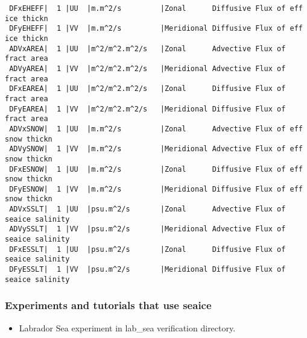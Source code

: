 \begin{table}[h!]
{\begin{verbatim}
 DFxEHEFF|  1 |UU  |m.m^2/s         |Zonal      Diffusive Flux of eff ice thickn
 DFyEHEFF|  1 |VV  |m.m^2/s         |Meridional Diffusive Flux of eff ice thickn
 ADVxAREA|  1 |UU  |m^2/m^2.m^2/s   |Zonal      Advective Flux of fract area
 ADVyAREA|  1 |VV  |m^2/m^2.m^2/s   |Meridional Advective Flux of fract area
 DFxEAREA|  1 |UU  |m^2/m^2.m^2/s   |Zonal      Diffusive Flux of fract area
 DFyEAREA|  1 |VV  |m^2/m^2.m^2/s   |Meridional Diffusive Flux of fract area
 ADVxSNOW|  1 |UU  |m.m^2/s         |Zonal      Advective Flux of eff snow thickn
 ADVySNOW|  1 |VV  |m.m^2/s         |Meridional Advective Flux of eff snow thickn
 DFxESNOW|  1 |UU  |m.m^2/s         |Zonal      Diffusive Flux of eff snow thickn
 DFyESNOW|  1 |VV  |m.m^2/s         |Meridional Diffusive Flux of eff snow thickn
 ADVxSSLT|  1 |UU  |psu.m^2/s       |Zonal      Advective Flux of seaice salinity
 ADVySSLT|  1 |VV  |psu.m^2/s       |Meridional Advective Flux of seaice salinity
 DFxESSLT|  1 |UU  |psu.m^2/s       |Zonal      Diffusive Flux of seaice salinity
 DFyESSLT|  1 |VV  |psu.m^2/s       |Meridional Diffusive Flux of seaice salinity
\end{verbatim}
}
\caption{~}
\end{table}



\subsubsection{Experiments and tutorials that use seaice}
\label{sec:pkg:seaice:experiments}

\begin{itemize}
\item{Labrador Sea experiment in lab\_sea verification directory. }
\end{itemize}

